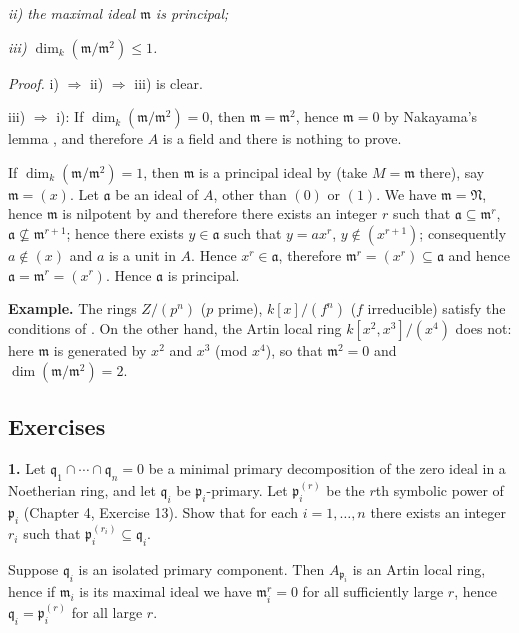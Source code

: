 \emph{ii) the maximal ideal \(\mathfrak m\) is principal;}

\emph{iii) \(\dim_k(\mathfrak m/\mathfrak m^2)\leq1\).}

\noindent\emph{Proof.} i) \(\Rightarrow\) ii) \(\Rightarrow\) iii) is clear.

iii) \(\Rightarrow\) i): If \(\dim_k(\mathfrak m/\mathfrak m^2)=0\), then \(\mathfrak m=\mathfrak m^2\), hence \(\mathfrak m=0\) by Nakayama's lemma , and therefore \(A\) is a field and there is nothing to prove.

If \(\dim_k(\mathfrak m/\mathfrak m^2)=1\), then \(\mathfrak m\) is a principal ideal by  (take \(M=\mathfrak m\) there), say \(\mathfrak m=(x)\). Let \(\mathfrak a\) be an ideal of \(A\), other than \((0)\) or \((1)\). We have \(\mathfrak m=\mathfrak N\), hence \(\mathfrak m\) is nilpotent by  and therefore there exists an integer \(r\) such that \(\mathfrak a\subseteq\mathfrak m^r\), \(\mathfrak a\not\subseteq\mathfrak m^{r+1}\); hence there exists \(y\in\mathfrak a\) such that \(y=ax^r\), \(y\notin(x^{r+1})\); consequently \(a\notin(x)\) and \(a\) is a unit in \(A\). Hence \(x^r\in\mathfrak a\), therefore \(\mathfrak m^r=(x^r)\subseteq\mathfrak a\) and hence \(\mathfrak a=\mathfrak m^r=(x^r)\). Hence \(\mathfrak a\) is principal. \proofbox

\noindent\textbf{Example.} The rings \(Z/(p^n)\) (\(p\) prime), \(k[x]/(f^n)\) (\(f\) irreducible) satisfy the conditions of . On the other hand, the Artin local ring \(k[x^2,x^3]/(x^4)\) does not: here \(\mathfrak m\) is generated by \(x^2\) and \(x^3\) (mod \(x^4\)), so that \(\mathfrak m^2=0\) and \(\dim(\mathfrak m/\mathfrak m^2)=2\).

\subsection{Exercises}

\noindent\textbf{1.} Let \(\mathfrak q_1\cap\cdots\cap\mathfrak q_n=0\) be a minimal primary decomposition of the zero ideal in a Noetherian ring, and let \(\mathfrak q_i\) be \(\mathfrak p_i\)-primary. Let \(\mathfrak p_i^{(r)}\) be the \(r\)th symbolic power of \(\mathfrak p_i\) (Chapter 4, Exercise 13). Show that for each \(i=1,\ldots,n\) there exists an integer \(r_i\) such that \(\mathfrak p_i^{(r_i)}\subseteq\mathfrak q_i\).

Suppose \(\mathfrak q_i\) is an isolated primary component. Then \(A_{\mathfrak p_i}\) is an Artin local ring, hence if \(\mathfrak m_i\) is its maximal ideal we have \(\mathfrak m_i^r=0\) for all sufficiently large \(r\), hence \(\mathfrak q_i=\mathfrak p_i^{(r)}\) for all large \(r\).

